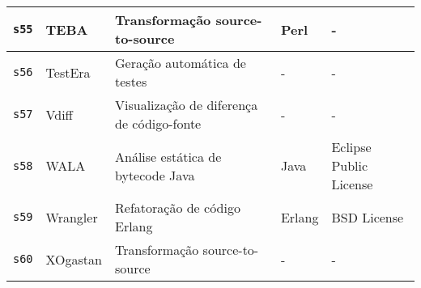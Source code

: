 \begin{longtable}{| l | p{4.5cm} | p{7cm} | p{2.5cm} | p{2.5cm} |}
    \hline
    \texttt{s55} &
      TEBA &
      Transformação source-to-source &
      Perl &
      - \\
    \hline
    \texttt{s56} &
      TestEra &
      Geração automática de testes &
      - &
      - \\
    \hline
    \texttt{s57} &
      Vdiff &
      Visualização de diferença de código-fonte &
      - &
      - \\
    \hline
    \texttt{s58} &
      WALA &
      Análise estática de bytecode Java &
      Java &
      Eclipse Public License \\
    \hline
    \texttt{s59} &
      Wrangler &
      Refatoração de código Erlang &
      Erlang &
      BSD License \\
    \hline
    \texttt{s60} &
      XOgastan &
      Transformação source-to-source &
      - &
      - \\
    \hline
  \hline
\end{longtable}
